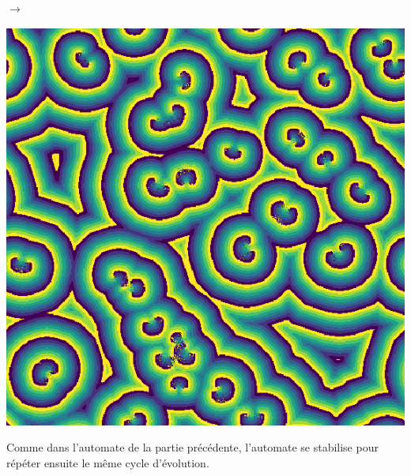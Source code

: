 \documentclass[12pt, a4paper]{article}
\begin{document}
\begin{center}
\begin{minipage}{.17\linewidth}
                \end{minipage}
                $\rightarrow$
                \begin{minipage}{.17\linewidth}
                    \includegraphics[scale=0.15]{img/part3/1/step4.png}
                \end{minipage}
            \end{center}
            Comme dans l'automate de la partie précédente, l'automate se stabilise pour répéter ensuite le même cycle d'évolution.
        
        
\end{document}
